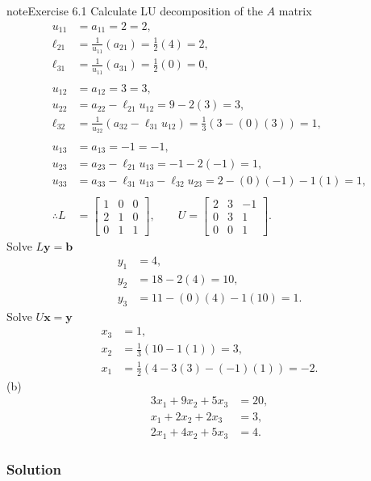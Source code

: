 \documentclass[letterpaper,10pt,english]{jupyterBook}
\begin{document}
\begin{sphinxadmonition}{note}{Exercise 6.1}
\sphinxAtStartPar
Calculate LU decomposition of the \(A\) matrix
\begin{align*}
    u_{11} &= a_{11} = 2 = 2, \\
    \ell_{21} &= \frac{1}{u_{11}}\left(a_{21}\right) = \frac{1}{2}\left(4\right) = 2, \\
    \ell_{31} &= \frac{1}{u_{11}}\left(a_{31}\right) = \frac{1}{2}\left(0\right) = 0, \\
    \\
    u_{12} &= a_{12} = 3 = 3, \\
    u_{22} &= a_{22} - \ell_{21} u_{12} = 9 - 2\left(3\right) = 3, \\
    \ell_{32} &= \frac{1}{u_{22}}\left(a_{32} - \ell_{31} u_{12}\right) = \frac{1}{3}\left(3 - \left(0\right)\left(3\right)\right) = 1, \\
    \\
    u_{13} &= a_{13} = -1 = -1, \\
    u_{23} &= a_{23} - \ell_{21} u_{13} = -1 - 2\left(-1\right) = 1, \\
    u_{33} &= a_{33} - \ell_{31} u_{13} - \ell_{32} u_{23} = 2 - \left(0\right)\left(-1\right) - 1\left(1\right) = 1, \\
    \\
    \therefore L &= \left[\begin{matrix}1 & 0 & 0\\2 & 1 & 0\\0 & 1 & 1\end{matrix}\right], \qquad
    U = \left[\begin{matrix}2 & 3 & -1\\0 & 3 & 1\\0 & 0 & 1\end{matrix}\right].
\end{align*}
\sphinxAtStartPar
Solve \(L \mathbf{{y}} = \mathbf{{b}}\)
\begin{align*}
    y_{1} &= 4, \\
    y_{2} &= 18 - 2\left(4\right) = 10, \\
    y_{3} &= 11 - \left(0\right)\left(4\right) - 1\left(10\right) = 1.
\end{align*}
\sphinxAtStartPar
Solve \(U \mathbf{{x}} = \mathbf{{y}}\)
\begin{align*}
    x_{3} &= 1, \\
    x_{2} &= \frac{1}{3}\left(10 - 1\left(1\right)\right) = 3, \\
    x_{1} &= \frac{1}{2}\left(4 - 3\left(3\right) - \left(-1\right)\left(1\right)\right) = -2.
\end{align*}
\sphinxAtStartPar
(b)
\begin{align*}
    3 x_1 + 9 x_2 + 5 x_3 &= 20,\\
      x_1 + 2 x_2 + 2 x_3 &=  3,\\
    2 x_1 + 4 x_2 + 5 x_3 &=  4.
\end{align*}\subsubsection*{Solution}


\end{sphinxadmonition}
\end{document}
